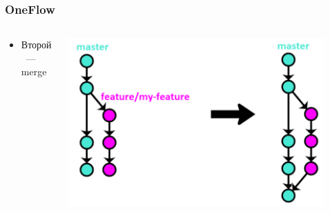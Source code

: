 \documentclass{../../slides-style}
\begin{document}
    \begin{frame}
        \frametitle{OneFlow}
        \begin{columns}
            \begin{column}{0.4\textwidth}
                \begin{itemize}
                    \item Второй~--- merge
                \end{itemize}
            \end{column}
            \begin{column}{0.6\textwidth}
                \begin{center}
                    \includegraphics[width=0.9\textwidth]{oneflow2.png}
                \end{center}
            \end{column}
        \end{columns}
    \end{frame}
\end{document}
